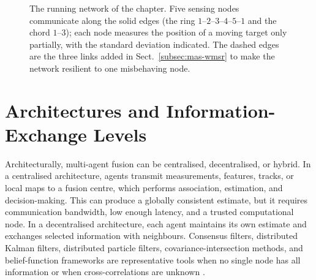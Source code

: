 \documentclass[graybox,envcountchap]{style/SNmono}
\begin{document}
\begin{figure}[!t]
\centering
{}
\caption{The running network of the chapter. Five sensing nodes communicate along the solid edges (the ring $1$--$2$--$3$--$4$--$5$--$1$ and the chord $1$--$3$); each node measures the position of a moving target only partially, with the standard deviation indicated. The dashed edges are the three links added in Sect.~\ref{subsec:mas-wmsr} to make the network resilient to one misbehaving node.}
\label{fig:mas-network}
\end{figure}

\section{Architectures and Information-Exchange Levels}
\label{sec:mas-architectures}

Architecturally, multi-agent fusion can be centralised, decentralised, or hybrid. In a centralised architecture, agents transmit measurements, features, tracks, or local maps to a fusion centre, which performs association, estimation, and decision-making. This can produce a globally consistent estimate, but it requires communication bandwidth, low enough latency, and a trusted computational node. In a decentralised architecture, each agent maintains its own estimate and exchanges selected information with neighbours. Consensus filters, distributed Kalman filters, distributed particle filters, covariance-intersection methods, and belief-function frameworks are representative tools when no single node has all information or when cross-correlations are unknown \cite{khaleghi_multisensor_2013,foglietta_networked_2012}.
\end{document}
